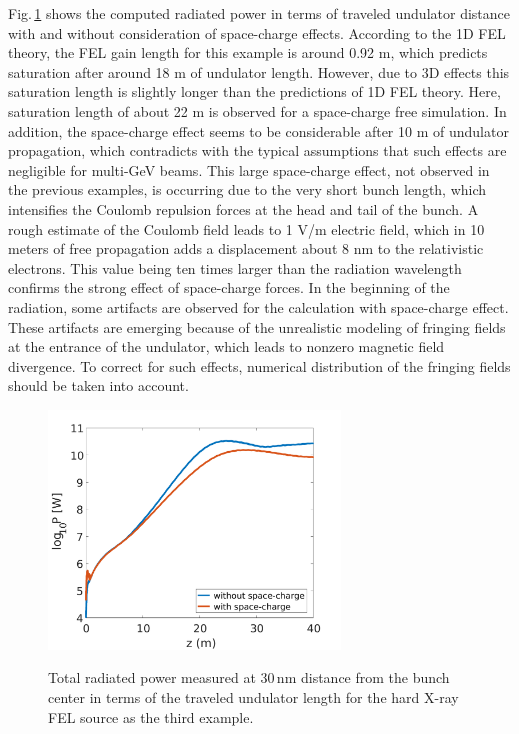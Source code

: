 Fig.\,\ref{power-example5} shows the computed radiated power in terms of traveled undulator distance with and without consideration of space-charge effects.
%
According to the 1D FEL theory, the FEL gain length for this example is around 0.92 m, which predicts saturation after around 18 m of undulator length.
%
However, due to 3D effects this saturation length is slightly longer than the predictions of 1D FEL theory.
%
Here, saturation length of about 22 m is observed for a space-charge free simulation.
%
In addition, the space-charge effect seems to be considerable after 10 m of undulator propagation, which contradicts with the typical assumptions that such effects are negligible for multi-GeV beams.
%
This large space-charge effect, not observed in the previous examples, is occurring due to the very short bunch length, which intensifies the Coulomb repulsion forces at the head and tail of the bunch.
%
A rough estimate of the Coulomb field leads to 1 V/m electric field, which in 10 meters of free propagation adds a displacement about 8 nm to the relativistic electrons.
%
This value being ten times larger than the radiation wavelength confirms the strong effect of space-charge forces.
%
In the beginning of the radiation, some artifacts are observed for the calculation with space-charge effect.
%
These artifacts are emerging because of the unrealistic modeling of fringing fields at the entrance of the undulator, which leads to nonzero magnetic field divergence.
%
To correct for such effects, numerical distribution of the fringing fields should be taken into account.
%
\begin{figure}
	\centering
	\includegraphics[height=2.5in]{./MITHRA_EXAMPLES/Fig11/Fig11.pdf} \\
    \caption{Total radiated power measured at 30\,nm distance from the bunch center in terms of the traveled undulator length for the hard X-ray FEL source as the third example.}
	\label{power-example5}
\end{figure}
